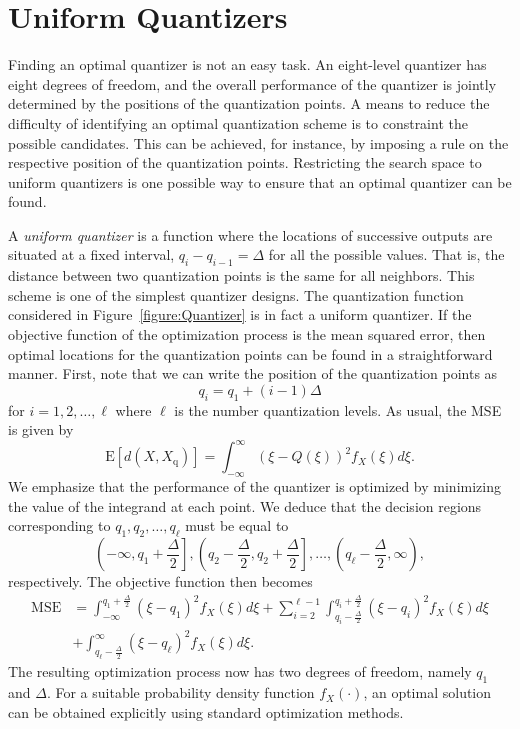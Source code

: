 \section{Uniform Quantizers}
\label{section:UniformQuantizers}

Finding an optimal quantizer is not an easy task.
An eight-level quantizer has eight degrees of freedom, and the overall performance of the quantizer is jointly determined by the positions of the quantization points.
A means to reduce the difficulty of identifying an optimal quantization scheme is to constraint the possible candidates.
This can be achieved, for instance, by imposing a rule on the respective position of the quantization points.
Restricting the search space to uniform quantizers is one possible way to ensure that an optimal quantizer can be found.

A \emph{uniform quantizer} is a function where the locations of successive outputs are situated at a fixed interval, $q_i - q_{i-1} = \Delta$ for all the possible values.
That is, the distance between two quantization points is the same for all neighbors.
This scheme is one of the simplest quantizer designs.
The quantization function considered in Figure~\ref{figure:Quantizer} is in fact a uniform quantizer.
If the objective function of the optimization process is the mean squared error, then optimal locations for the quantization points can be found in a straightforward manner.
First, note that we can write the position of the quantization points as
\begin{equation*}
q_i = q_1 + (i-1) \Delta
\end{equation*}
for $i = 1, 2, \ldots, \ell$ where $\ell$ is the number quantization levels.
As usual, the MSE is given by
\begin{equation*}
\mathrm{E} [ d(X, X_{\mathrm{q}}) ]
= \int_{-\infty}^{\infty} (\xi - Q(\xi))^2 f_X(\xi) d\xi .
\end{equation*}
We emphasize  that the performance of the quantizer is optimized by minimizing the value of the integrand at each point.
We deduce that the decision regions corresponding to $q_1, q_2, \ldots, q_{\ell}$ must be equal to
\begin{equation*}
\left( - \infty, q_1 + \frac{\Delta}{2} \right],
\left( q_2 - \frac{\Delta}{2}, q_2 + \frac{\Delta}{2} \right],
\ldots,
\left( q_{\ell} - \frac{\Delta}{2}, \infty \right) ,
\end{equation*}
respectively.
The objective function then becomes
\begin{equation} \label{equation:UniformQuantizerMSE}
\begin{split}
\text{MSE} &= \int_{-\infty}^{q_1 + \frac{\Delta}{2}} (\xi - q_1)^2 f_X(\xi) d\xi
+ \sum_{i=2}^{{\ell}-1}
\int_{q_i - \frac{\Delta}{2}}^{q_i + \frac{\Delta}{2}}
(\xi - q_i)^2 f_X(\xi) d\xi \\
&+ \int_{q_{\ell} - \frac{\Delta}{2}}^{\infty} (\xi - q_{\ell})^2 f_X(\xi) d\xi .
\end{split}
\end{equation}
The resulting optimization process now has two degrees of freedom, namely $q_1$ and $\Delta$.
For a suitable probability density function $f_X(\cdot)$, an optimal solution can be obtained explicitly using standard optimization methods.

